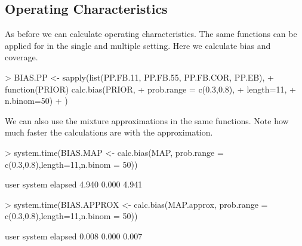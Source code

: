 \documentclass{article}
\begin{document}
\subsection{Operating Characteristics}
As before we can calculate operating characteristics. The same functions can be applied for in the single and multiple setting. Here we calculate bias and coverage.
\begin{Schunk}
\begin{Sinput}
> BIAS.PP <- sapply(list(PP.FB.11, PP.FB.55, PP.FB.COR, PP.EB), 
+                   function(PRIOR) calc.bias(PRIOR,
+                                             prob.range = c(0.3,0.8),
+                                             length=11,
+                                             n.binom=50)
+ )
\end{Sinput}
\end{Schunk}

We can also use the mixture approximations in the same functions. Note how much faster the calculations are with the approximation.
\begin{Schunk}
\begin{Sinput}
> system.time(BIAS.MAP <- calc.bias(MAP, prob.range = c(0.3,0.8),length=11,n.binom = 50))
\end{Sinput}
\begin{Soutput}
   user  system elapsed 
  4.940   0.000   4.941 
\end{Soutput}
\begin{Sinput}
> system.time(BIAS.APPROX <- calc.bias(MAP.approx, prob.range = c(0.3,0.8),length=11,n.binom = 50))
\end{Sinput}
\begin{Soutput}
   user  system elapsed 
  0.008   0.000   0.007 
\end{Soutput}
\end{Schunk}
\end{document}
